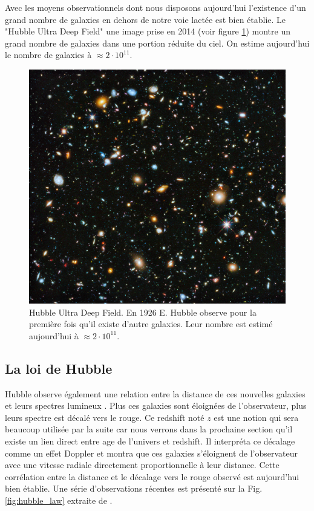 Avec les moyens observationnels dont nous disposons aujourd'hui l’existence d'un grand nombre de galaxies en dehors de notre voie lactée est bien établie.
Le "Hubble Ultra Deep Field" \citep{1538-3881-132-5-1729} une image prise en 2014 (voir figure \ref{fig:hubbl_deep_field}) montre un grand nombre de galaxies dans une portion réduite du ciel.
On estime aujourd'hui le nombre de galaxies à $\approx 2 \cdot 10^{11}$.

\begin{figure}[bth]
        \includegraphics[width=.9\linewidth]{img/01/hudf.jpeg} 
        \caption[Hubble Ultra Deep Field]{Hubble Ultra Deep Field.
		En 1926 E. Hubble observe pour la première fois qu'il existe d'autre galaxies.
		Leur nombre est estimé aujourd'hui à $\approx 2 \cdot 10^{11}$.
 		\label{fig:hubbl_deep_field}}
\end{figure}

\subsection{La loi de Hubble}
Hubble observe également une relation entre la distance de ces nouvelles galaxies et leurs spectres lumineux \citep{1929CoMtW...3...23H}.
Plus ces galaxies sont éloignées de l'observateur, plus leurs spectre est décalé vers le rouge.
Ce redshift noté $z$ est une notion qui sera beaucoup utilisée par la suite car nous verrons dans la prochaine section qu'il existe un lien direct entre age de l'univers et redshift.
Il interpréta ce décalage comme un effet Doppler et montra que ces galaxies s'éloignent de l'observateur avec une vitesse radiale directement proportionnelle à leur distance.
Cette corrélation entre la distance et le décalage vers le rouge observé est aujourd'hui bien établie.
Une série d'observations récentes est présenté sur la Fig. \ref{fig:hubble_law} extraite de \citep{2015PNAS..112.3173B}.

